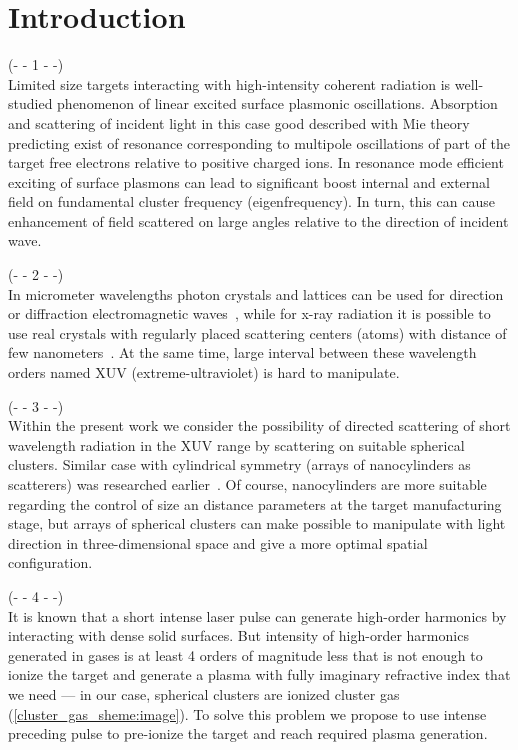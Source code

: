 \section{Introduction}

\noindent(- - 1 - -)\\
Limited size targets interacting with high-intensity coherent radiation is well-studied phenomenon of linear excited surface plasmonic oscillations. Absorption and scattering of incident light in this case good described with Mie theory predicting exist of resonance corresponding to multipole oscillations of part of the target free electrons relative to positive charged ions. In resonance mode efficient exciting of surface plasmons can lead to significant boost internal and external field on fundamental cluster frequency (eigenfrequency). In turn, this can cause enhancement of field scattered on large angles relative to the direction of incident wave. 

\noindent(- - 2 - -)\\
In micrometer wavelengths photon crystals and lattices can be used for direction or diffraction electromagnetic waves~\cite{lin_zhang}, while for x-ray radiation it is possible to use real crystals with regularly placed scattering centers (atoms) with distance of few nanometers~\cite{batterman_cole}. At the same time, large interval between these wavelength orders named XUV (extreme-ultraviolet) is hard to manipulate.

\noindent(- - 3 - -)\\
Within the present work we consider the possibility of directed scattering of short wavelength radiation in the XUV range by scattering on suitable spherical clusters. Similar case with cylindrical symmetry (arrays of nanocylinders as scatterers) was researched earlier~\cite{andreev_lecz}. Of course, nanocylinders are more suitable regarding the control of size an distance parameters at the target manufacturing stage, but arrays of spherical clusters can make possible to manipulate with light direction in three-dimensional space and give a more optimal spatial configuration.


\noindent(- - 4 - -)\\
It is known that a short intense laser pulse can generate high-order harmonics by interacting with dense solid surfaces. But intensity of high-order harmonics generated in gases is at least 4 orders of magnitude less that is not enough to ionize the target and generate a plasma with fully imaginary refractive index that we need --- in our case, spherical clusters are ionized cluster gas (\autoref{cluster_gas_sheme:image}). To solve this problem we propose to use intense preceding pulse to pre-ionize the target and reach required plasma generation.


